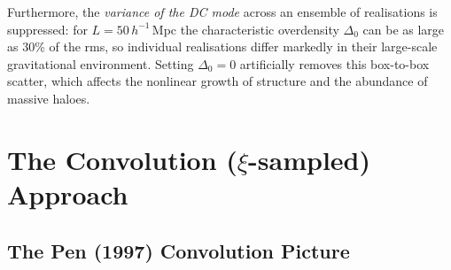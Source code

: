 \documentclass[12pt]{article}
\begin{document}
Furthermore, the \emph{variance of the DC mode} across an ensemble of
realisations is suppressed: for $L = 50\,h^{-1}$\,Mpc the characteristic
overdensity $\Delta_0$ can be as large as 30\% of the rms, so individual
realisations differ markedly in their large-scale gravitational
environment.  Setting $\Delta_0 = 0$ artificially removes this
box-to-box scatter, which affects the nonlinear growth of structure and
the abundance of massive haloes.

\section{The Convolution ($\xi$-sampled) Approach}
\label{sec:convolution}

\subsection{The Pen (1997) Convolution Picture}
\end{document}
